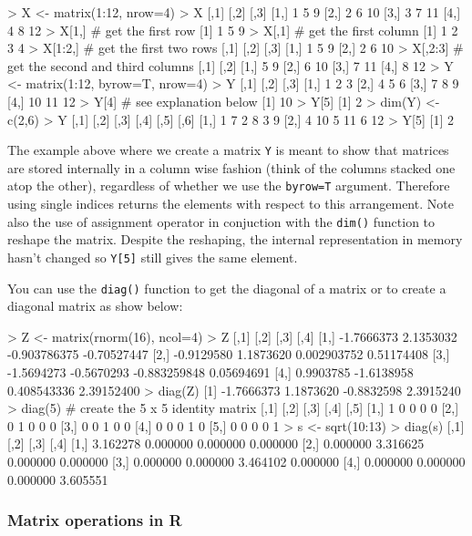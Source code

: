 \begin{R}
> X <- matrix(1:12, nrow=4)
> X
     [,1] [,2] [,3]
[1,]    1    5    9
[2,]    2    6   10
[3,]    3    7   11
[4,]    4    8   12
> X[1,] # get the first row
[1] 1 5 9
> X[,1] # get the first column
[1] 1 2 3 4
> X[1:2,] # get the first two rows
     [,1] [,2] [,3]
[1,]    1    5    9
[2,]    2    6   10
> X[,2:3] # get the second and third columns
     [,1] [,2]
[1,]    5    9
[2,]    6   10
[3,]    7   11
[4,]    8   12
> Y <- matrix(1:12, byrow=T, nrow=4)
> Y
     [,1] [,2] [,3]
[1,]    1    2    3
[2,]    4    5    6
[3,]    7    8    9
[4,]   10   11   12
> Y[4] # see explanation below
[1] 10
> Y[5]
[1] 2
> dim(Y) <- c(2,6)
> Y
     [,1] [,2] [,3] [,4] [,5] [,6]
[1,]    1    7    2    8    3    9
[2,]    4   10    5   11    6   12
> Y[5]
[1] 2
\end{R}
The example above where we create a matrix \lstinline!Y! is meant to
show that matrices are stored internally in a column wise fashion (think
of the columns stacked one atop the other), regardless of whether we use
the \lstinline!byrow=T! argument. Therefore using single indices returns
the elements with respect to this arrangement. Note also the use of
assignment operator in conjuction with the \lstinline!dim()! function to
reshape the matrix. Despite the reshaping, the internal representation
in memory hasn't changed so \lstinline!Y[5]! still gives the same
element.

You can use the \lstinline!diag()! function to get the diagonal of a
matrix or to create a diagonal matrix as show below:

\begin{R}
> Z <- matrix(rnorm(16), ncol=4)
> Z
           [,1]       [,2]         [,3]        [,4]
[1,] -1.7666373  2.1353032 -0.903786375 -0.70527447
[2,] -0.9129580  1.1873620  0.002903752  0.51174408
[3,] -1.5694273 -0.5670293 -0.883259848  0.05694691
[4,]  0.9903785 -1.6138958  0.408543336  2.39152400
> diag(Z)
[1] -1.7666373  1.1873620 -0.8832598  2.3915240
> diag(5) # create the 5 x 5 identity matrix
     [,1] [,2] [,3] [,4] [,5]
[1,]    1    0    0    0    0
[2,]    0    1    0    0    0
[3,]    0    0    1    0    0
[4,]    0    0    0    1    0
[5,]    0    0    0    0    1
> s <- sqrt(10:13)
> diag(s)
         [,1]     [,2]     [,3]     [,4]
[1,] 3.162278 0.000000 0.000000 0.000000
[2,] 0.000000 3.316625 0.000000 0.000000
[3,] 0.000000 0.000000 3.464102 0.000000
[4,] 0.000000 0.000000 0.000000 3.605551
\end{R}


\subsubsection{Matrix operations in R}

